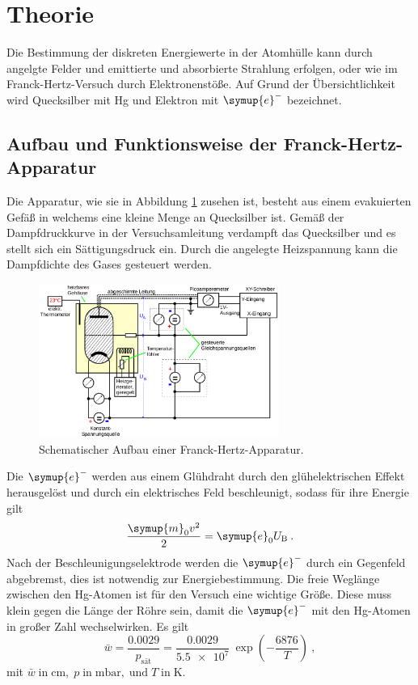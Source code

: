 \section{Theorie}
\label{sec:theorie}
Die Bestimmung der diskreten Energiewerte in der Atomhülle kann durch
angelgte Felder und emittierte und absorbierte Strahlung erfolgen,
oder wie im Franck-Hertz-Versuch durch Elektronenstöße.
Auf Grund der Übersichtlichkeit wird Quecksilber mit Hg und Elektron mit
$\symup{e}^{-}$ bezeichnet.

\subsection{Aufbau und Funktionsweise der Franck-Hertz-Apparatur}
Die Apparatur, wie sie in Abbildung \ref{fig:franckaufbau} zusehen ist, besteht
aus einem evakuierten Gefäß in welchems eine kleine Menge an Quecksilber ist.
Gemäß der Dampfdruckkurve in der Versuchsamleitung \cite{Anleitung}
verdampft das Quecksilber und es stellt sich ein Sättigungsdruck ein.
Durch die angelegte Heizspannung kann die Dampfdichte des Gases gesteuert werden.

\begin{figure}
    \centering
    \includegraphics[width=0.7\textwidth]{content/aufbau_franck-hertz.png}
    \caption{Schematischer Aufbau einer Franck-Hertz-Apparatur. \cite{Anleitung}}
    \label{fig:franckaufbau}
\end{figure}

Die $\symup{e}^{-}$ werden aus einem Glühdraht durch den glühelektrischen Effekt
herausgelöst und durch ein elektrisches Feld beschleunigt, sodass für ihre Energie gilt
\begin{equation}
    \frac{\symup{m}_0 v^2}{2} = \symup{e}_0 U_\text{B}\:.
    \label{eqn:beschleunigung}
\end{equation}
Nach der Beschleunigungselektrode werden die $\symup{e}^{-}$ durch ein Gegenfeld abgebremst,
dies ist notwendig zur Energiebestimmung.
Die freie Weglänge zwischen den Hg-Atomen ist für den Versuch eine wichtige
Größe. Diese muss klein gegen die Länge der Röhre sein, damit die $\symup{e}^{-}$
mit den Hg-Atomen in großer Zahl wechselwirken. Es gilt
\begin{equation}
    \bar{w} = \frac{0.0029}{p_\text{sät}} = \frac{0.0029}{\num{5.5e7}}\:\exp\!\left(-\frac{6876}{T}\right)\:,
    \label{eqn:wbar}
\end{equation}
mit $\bar{w}\;\text{in}\;\si{\centi\meter},\;p\;\text{in}\;\si{\milli\bar},
\;\text{und}\;T\;\text{in}\;\si{\kelvin}.$

